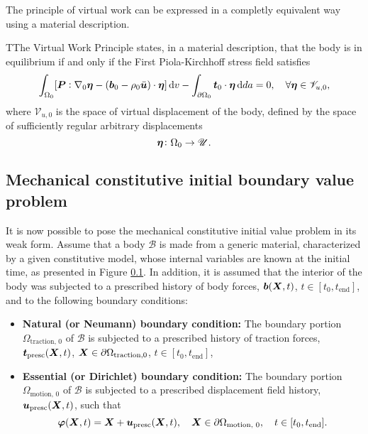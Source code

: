 The principle of virtual work can be expressed in a completly equivalent way using a material description.
\begin{problem}
TThe Virtual Work Principle states, in a material description, that the body is in equilibrium if and only if the First Piola-Kirchhoff stress field satisfies
    \begin{equation}
        \int_{\Omega_0} [\bm{P}:\nabla_0 \bm{\eta} - (\bm{b}_0 - \rho_0 \ddot{\bm u})\cdot \bm{\eta}]\,\mathrm{d} v - \int_{\partial\Omega_0} \bm{t}_0\cdot \bm{\eta}\,\mathrm{d} da = 0,\quad \forall \bm{\eta} \in \mathscr{V}_{u,0},
    \end{equation}
 where $\mathscr{V}_{u,0}$ is the space of virtual displacement of the body, defined by the space of sufficiently regular arbitrary displacements
 \begin{equation}
     \bm{\eta}\colon \Omega_0\to \mathscr{U}.
 \end{equation}
\end{problem}

\subsection{Mechanical constitutive initial boundary value problem}

It is now possible to pose the mechanical constitutive initial value problem in its weak form.
Assume that a body $\mathscr{B}$ is made from a generic material, characterized by a given constitutive model, whose internal variables are known at the initial time, as presented in Figure \ref{}.
In addition, it is assumed that the interior of the body was subjected to a prescribed history of body forces, $\bm{b}(\bm X, t)$, $t\in[t_0, t_\text{end}]$, and to the following boundary conditions:
\begin{itemize}
    \item \textbf{Natural (or Neumann) boundary condition:}
    The boundary portion $\Omega_\text{traction, 0}$ of $\mathscr{B}$ is subjected to a prescribed history of traction forces, $\bm{t}_\text{presc}(\bm{X}, t)$, $\bm{X}\in \partial \Omega_\text{traction,0}$, $t\in[t_0, t_\text{end}]$,\\
    \item \textbf{Essential (or Dirichlet) boundary condition:}
    The boundary portion $\Omega_\text{motion, 0}$ of $\mathscr{B}$ is subjected to a prescribed displacement field history, $\bm{u}_\text{presc}(\bm{X}, t)$, such that $$\bm{\varphi}(\bm{X}, t) = \bm{X} + \bm{u}_\text{presc}(\bm{X}, t),\quad \bm{X}\in \partial\Omega_\text{motion, 0},\quad t\in[t_0, t_\text{end}].$$
\end{itemize}

